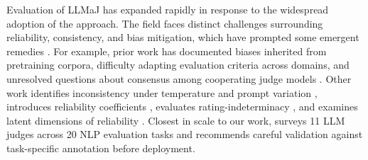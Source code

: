 \documentclass[11pt]{article}
\begin{document}


Evaluation of LLMaJ has expanded rapidly in response to the widespread adoption of the approach. The field faces distinct challenges surrounding reliability, consistency, and bias mitigation, which have prompted some emergent remedies \citep{gu2024survey, li-etal-2025-generation}. For example, prior work has documented biases inherited from pretraining corpora, difficulty adapting evaluation criteria across domains, and unresolved questions about consensus among cooperating judge models \citep{li2024comprehensive}. Other work identifies inconsistency under temperature and prompt variation \citep{stureborg2024large}, introduces reliability coefficients \citep{schroeder2024trust}, evaluates rating-indeterminacy \citep{guerdan2025validating}, and examines latent dimensions of reliability \citep{choi2026diagnosing}. %
Closest in scale to our work, \citet{bavaresco2025llms} surveys 11 LLM judges across 20 NLP evaluation tasks and recommends careful validation against task-specific annotation before deployment. 


\end{document}
